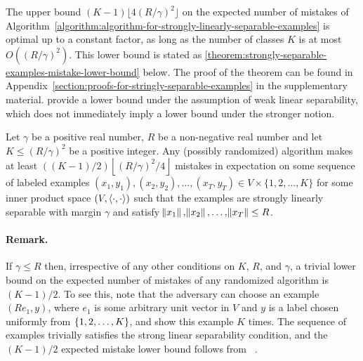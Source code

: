 The upper bound $(K-1) \lfloor 4(R/\gamma)^2 \rfloor$ on the expected number of
mistakes of
Algorithm~\ref{algorithm:algorithm-for-strongly-linearly-separable-examples} is
optimal up to a constant factor, as long as the number of classes $K$ is at most
$O((R/\gamma)^2)$. This lower bound is stated as
\autoref{theorem:strongly-separable-examples-mistake-lower-bound} below. The
proof of the theorem can be found in
Appendix~\ref{section:proofs-for-stringly-separable-examples} in the
supplementary material. \citet{Daniely-Helbertal-2013} provide a lower bound
under the assumption of weak linear separability, which does not immediately
imply a lower bound under the stronger notion.

\begin{theorem}
\label{theorem:strongly-separable-examples-mistake-lower-bound}
Let $\gamma$ be a positive real number, $R$ be a non-negative real number and
let $K \le (R/\gamma)^2$ be a positive integer. Any (possibly randomized)
algorithm makes at least $((K-1)/2)\left\lfloor (R/\gamma)^2/4 \right\rfloor$
mistakes in expectation on some sequence of labeled examples $(x_1, y_1),
(x_2, y_2), \dots, (x_T, y_T) \in V \times \{1,2,\dots,K\}$ for some inner
product space $(V, \left\langle \cdot, \cdot \right\rangle)$ such that the examples are strongly
linearly separable with margin $\gamma$ and satisfy $\norm{x_1}, \norm{x_2},
\dots, \norm{x_T} \le R$.
\end{theorem}

\paragraph{Remark.}
If $\gamma \le R$ then, irrespective of any other conditions on $K$, $R$, and
$\gamma$, a trivial lower bound on the expected number of mistakes of any
randomized algorithm is $(K-1)/2$. To see this, note that the adversary can
choose an example $(R e_1, y)$, where $e_1$ is some arbitrary unit vector in $V$
and $y$ is a label chosen uniformly from $\cbr{1,2,\dots,K}$, and show this
example $K$ times. The sequence of examples trivially satisfies the strong
linear separability condition, and the $(K-1)/2$ expected mistake lower bound
follows from ~\citep[][Claim 2]{Daniely-Helbertal-2013}. %


